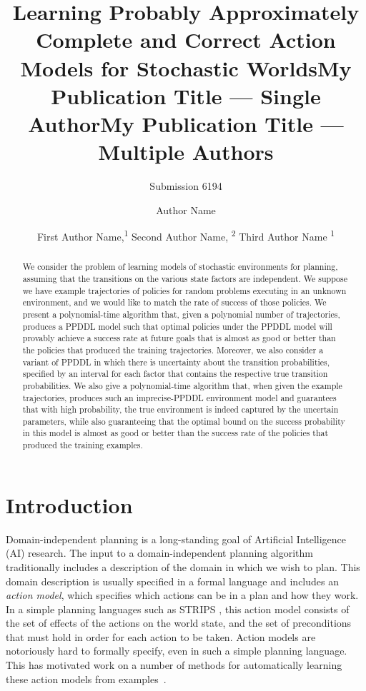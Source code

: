 \documentclass[letterpaper]{article} %
\title{Learning Probably  Approximately Complete and Correct Action Models for Stochastic Worlds}
\author{Submission 6194}
\title{My Publication Title --- Single Author}
\author {
    Author Name
}
\title{My Publication Title --- Multiple Authors}
\author {
    First Author Name,\textsuperscript{\rm 1}
    Second Author Name, \textsuperscript{\rm 2}
    Third Author Name \textsuperscript{\rm 1}
}
\begin{document}
\maketitle

\begin{abstract}
We consider the problem of learning models of stochastic environments for planning, assuming that the transitions on the various state factors are independent. We suppose we have example trajectories of policies for random problems executing in an unknown environment, and we would like to match the rate of success of those policies. We present a polynomial-time algorithm that, given a polynomial number of trajectories, produces a PPDDL model such that optimal policies under the PPDDL model will provably achieve a success rate at future goals that is almost as good or better than the policies that produced the training trajectories. Moreover, we also consider a variant of PPDDL in which there is uncertainty about the transition probabilities, specified by an interval for each factor that contains the respective true transition probabilities. We also give a polynomial-time algorithm that, when given the example trajectories, produces such an imprecise-PPDDL environment model and guarantees that with high probability, the true environment is indeed captured by the uncertain parameters, while also guaranteeing that the optimal bound on the success probability in this model is almost as good or better than the success rate of the policies that produced the training examples.  
\end{abstract}

\section{Introduction}

Domain-independent planning is a long-standing goal of Artificial Intelligence (AI) research. 
The input to a domain-independent planning algorithm traditionally includes a description of the domain in which we wish to plan.
This domain description is usually specified in a formal language and includes an \emph{action model}, which specifies which actions can be in a plan and how they work. 
In a simple planning languages such as STRIPS \cite{fikes1971strips}, this action model consists of the set of effects of the actions on the world state, and the set of preconditions that must hold in order for each action to be taken. 
Action models are notoriously hard to formally specify, even in such a simple planning language. 
This has motivated work on a number of methods for automatically learning these action models from examples~\cite{yang2007learning,cresswell2011generalised,cresswell2013acquiring,zhuo2013action,stern2017efficientAndSafe,aineto19,juba2021kr}. 
\end{document}
